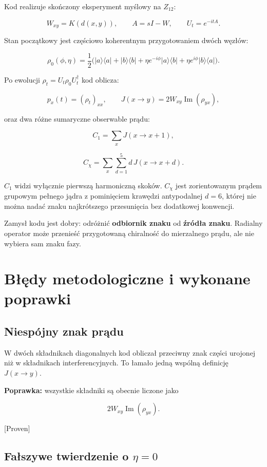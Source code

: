 \documentclass[11pt,a4paper,openany]{report}
\newcommand{\statusProven}{\textcolor{fingreen}{[Proven]}}
\begin{document}
Kod realizuje skończony eksperyment myślowy na \(Z_{12}\):

\[
W_{xy}=K(d(x,y)),\qquad
A=sI-W,\qquad
U_t=e^{-itA}.
\]

Stan początkowy jest częściowo koherentnym przygotowaniem dwóch węzłów:

\[
\rho_0(\phi,\eta)
=\frac12\Big(
|a\rangle\langle a|+|b\rangle\langle b|
+\eta e^{-i\phi}|a\rangle\langle b|
+\eta e^{i\phi}|b\rangle\langle a|
\Big).
\]

Po ewolucji \(\rho_t=U_t\rho_0U_t^\dagger\) kod oblicza:

\[
p_x(t)=(\rho_t)_{xx},
\qquad
J(x\to y)=2W_{xy}\operatorname{Im}(\rho_{yx}),
\]

oraz dwa ró\.zne sumaryczne obserwable prądu:

\[
C_1=\sum_xJ(x\to x+1),
\]

\[
C_\chi=\sum_x\sum_{d=1}^{5}d\,J(x\to x+d).
\]

\(C_1\) widzi wyłącznie pierwszą harmoniczną skoków. \(C_\chi\) jest zorientowanym prądem grupowym pełnego jądra z pominięciem krawędzi antypodalnej \(d=6\), której nie mo\.zna nadać znaku najkrótszego przesunięcia bez dodatkowej konwencji.

Zamysł kodu jest dobry: odró\.znić \textbf{odbiornik znaku} od \textbf{źródła znaku}. Radialny operator mo\.ze przenieść przygotowaną chiralność do mierzalnego prądu, ale nie wybiera sam znaku fazy.

\chapter{Błędy metodologiczne i wykonane poprawki}

\section{Niespójny znak prądu}

W dwóch składnikach diagonalnych kod obliczał przeciwny znak części urojonej ni\.z w składnikach interferencyjnych. To łamało jedną wspólną definicję \(J(x\to y)\).

\textbf{Poprawka:} wszystkie składniki są obecnie liczone jako

\[
2W_{xy}\operatorname{Im}(\rho_{yx}).
\]

\statusProven{}

\section{\texorpdfstring{Fałszywe twierdzenie o \(\eta=0\)}{Fałszywe twierdzenie o =0}}
\end{document}
